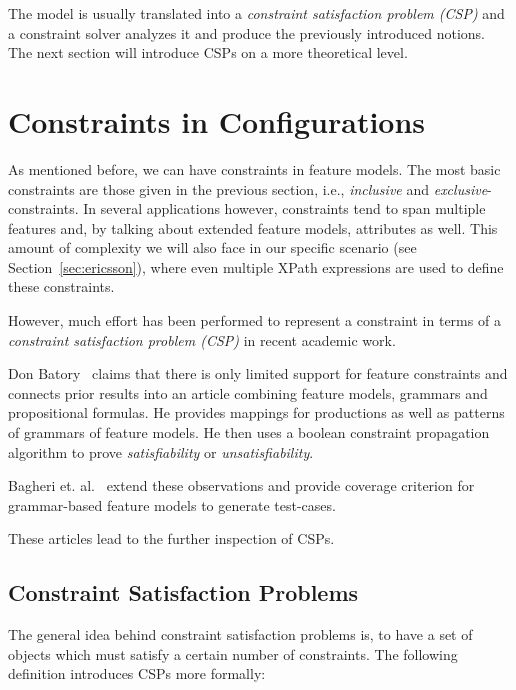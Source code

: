 The model is usually translated into a \emph{constraint satisfaction problem (CSP)} and a constraint solver analyzes it and produce the previously introduced notions. The next section will introduce CSPs on a more theoretical level. 




\section{Constraints in Configurations}\label{sec:constraints}



As mentioned before, we can have constraints in feature models. The most basic constraints are those given in the previous section, i.e., \emph{inclusive} and \emph{exclusive}-constraints. In several applications however, constraints tend to span multiple features and, by talking about extended feature models, attributes as well. This amount of complexity we will also face in our specific scenario (see Section~\ref{sec:ericsson}), where even multiple XPath expressions are used to define these constraints. 

However, much effort has been performed to represent a constraint in terms of a \emph{constraint satisfaction problem (CSP)} in recent academic work.


Don Batory~\cite{fm-grammar-prop} claims that there is only limited support for feature constraints and connects prior results into an article combining feature models, grammars and propositional formulas. He provides mappings for productions as well as patterns of grammars of feature models. He then uses a boolean constraint propagation algorithm to prove \emph{satisfiability} or \emph{unsatisfiability}. 

Bagheri et. al.~\cite{grammar-based-tc-generation-fm} extend these observations and provide coverage criterion for grammar-based feature models to generate test-cases. 

These articles lead to the further inspection of CSPs.

\subsection{Constraint Satisfaction Problems}\label{subsec:csp}

The general idea behind constraint satisfaction problems is, to have a set of objects which must satisfy a certain number of constraints. The following definition introduces CSPs more formally:

